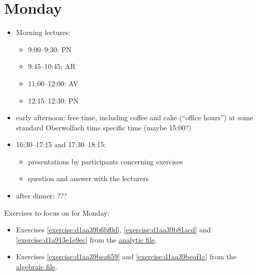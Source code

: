 \documentclass[reqno]{amsart} 
\begin{document}
\section{Monday}
\begin{itemize}
\item Morning lectures:
  \begin{itemize}
  \item 9:00--9:30: PN
  \item 9:45--10:45: AR
  \item 11:00--12:00: AV
  \item 12:15--12:30: PN
  \end{itemize}
\item early afternoon: free time, including coffee and cake (``office hours'') at some standard Oberwolfach time specific time (maybe 15:00?)
\item 16:30--17:15 and 17:30--18:15:
  \begin{itemize}
  \item presentations by participants concerning exercises
  \item question and answer with the lecturers
  \end{itemize}
\item after dinner: ???
\end{itemize}

Exercises to focus on for Monday:
\begin{itemize}
\item Exercises \ref{exercise:d1aa39b6bf0d}, \ref{exercise:d1aa39b81acd} and \ref{exercise:d1a913e1e9ec} from the \href{20230524T094424__exercises-localized-vectors.pdf}{analytic file}.
\item Exercises \ref{exercise:d1aa39bea659} and \ref{exercise:d1aa39beaf1c} from the \href{20230528T213149__microlocal-algebraic-exercises.pdf}{algebraic file}.
\end{itemize}

{} 
\end{document}
